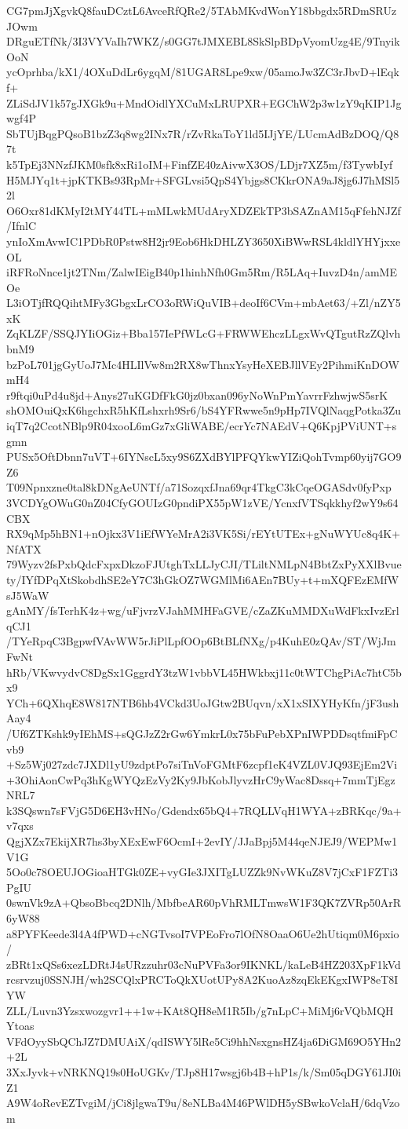 CG7pmJjXgvkQ8fauDCztL6AvceRfQRe2/5TAbMKvdWonY18bbgdx5RDmSRUzJOwm
DRguETfNk/3I3VYVaIh7WKZ/s0GG7tJMXEBL8SkSlpBDpVyomUzg4E/9TnyikOoN
ycOprhba/kX1/4OXuDdLr6ygqM/81UGAR8Lpe9xw/05amoJw3ZC3rJbvD+lEqkf+
ZLiSdJV1k57gJXGk9u+MndOidlYXCuMxLRUPXR+EGChW2p3w1zY9qKIP1Jgwgf4P
SbTUjBqgPQsoB1bzZ3q8wg2INx7R/rZvRkaToY1ld5IJjYE/LUcmAdBzDOQ/Q87t
k5TpEj3NNzfJKM0sfk8xRi1oIM+FinfZE40zAivwX3OS/LDjr7XZ5m/f3TywbIyf
H5MJYq1t+jpKTKBs93RpMr+SFGLvsi5QpS4Ybjgs8CKkrONA9aJ8jg6J7hMSl52l
O6Oxr81dKMyI2tMY44TL+mMLwkMUdAryXDZEkTP3bSAZnAM15qFfehNJZf/IfnlC
ynIoXmAvwIC1PDbR0Pstw8H2jr9Eob6HkDHLZY3650XiBWwRSL4kldlYHYjxxeOL
iRFRoNnce1jt2TNm/ZalwIEigB40p1hinhNfh0Gm5Rm/R5LAq+IuvzD4n/amMEOe
L3iOTjfRQQihtMFy3GbgxLrCO3oRWiQuVIB+deoIf6CVm+mbAet63/+Zl/nZY5xK
ZqKLZF/SSQJYIiOGiz+Bba157IePfWLcG+FRWWEhczLLgxWvQTgutRzZQlvhbnM9
bzPoL701jgGyUoJ7Mc4HLIlVw8m2RX8wThnxYsyHeXEBJllVEy2PihmiKnDOWmH4
r9ftqi0uPd4u8jd+Anys27uKGDfFkG0jz0bxan096yNoWnPmYavrrFzhwjwS5srK
shOMOuiQxK6hgchxR5hKfLshxrh9Sr6/bS4YFRwwe5n9pHp7IVQlNaqgPotka3Zu
iqT7q2CcotNBlp9R04xooL6mGz7xGliWABE/ecrYc7NAEdV+Q6KpjPViUNT+sgmn
PUSx5OftDbnn7uVT+6IYNscL5xy9S6ZXdBYlPFQYkwYIZiQohTvmp60yij7GO9Z6
T09Npnxzne0tal8kDNgAeUNTf/a71SozqxfJna69qr4TkgC3kCqeOGASdv0fyPxp
3VCDYgOWuG0nZ04CfyGOUIzG0pndiPX55pW1zVE/YcnxfVTSqkkhyf2wY9s64CBX
RX9qMp5hBN1+nOjkx3V1iEfWYeMrA2i3VK5Si/rEYtUTEx+gNuWYUc8q4K+NfATX
79Wyzv2fsPxbQdcFxpxDkzoFJUtghTxLLJyCJI/TLiltNMLpN4BbtZxPyXXlBvue
ty/IYfDPqXtSkobdhSE2eY7C3hGkOZ7WGMlMi6AEn7BUy+t+mXQFEzEMfWsJ5WaW
gAnMY/fsTerhK4z+wg/uFjvrzVJahMMHFaGVE/cZaZKuMMDXuWdFkxIvzErlqCJ1
/TYeRpqC3BgpwfVAvWW5rJiPlLpfOOp6BtBLfNXg/p4KuhE0zQAv/ST/WjJmFwNt
hRb/VKwvydvC8DgSx1GggrdY3tzW1vbbVL45HWkbxj11c0tWTChgPiAc7htC5bx9
YCh+6QXhqE8W817NTB6hb4VCkd3UoJGtw2BUqvn/xX1xSIXYHyKfn/jF3ushAay4
/Uf6ZTKshk9yIEhMS+sQGJzZ2rGw6YmkrL0x75bFuPebXPnIWPDDsqtfmiFpCvb9
+Sz5Wj027zdc7JXDl1yU9zdptPo7siTnVoFGMtF6zcpf1eK4VZL0VJQ93EjEm2Vi
+3OhiAonCwPq3hKgWYQzEzVy2Ky9JbKobJlyvzHrC9yWac8Dssq+7mmTjEgzNRL7
k3SQswn7sFVjG5D6EH3vHNo/Gdendx65bQ4+7RQLLVqH1WYA+zBRKqc/9a+v7qxs
QgjXZx7EkijXR7hs3byXExEwF6OcmI+2evIY/JJaBpj5M44qeNJEJ9/WEPMw1V1G
5Oo0c78OEUJOGioaHTGk0ZE+vyGIe3JXITgLUZZk9NvWKuZ8V7jCxF1FZTi3PgIU
0swnVk9zA+QbsoBbcq2DNlh/MbfbeAR60pVhRMLTmwsW1F3QK7ZVRp50ArR6yW88
a8PYFKeede3l4A4fPWD+cNGTvsoI7VPEoFro7lOfN8OaaO6Ue2hUtiqm0M6pxio/
zBRt1xQSs6xezLDRtJ4sURzzuhr03cNuPVFa3or9IKNKL/kaLeB4HZ203XpF1kVd
rcsrvzuj0SSNJH/wh2SCQlxPRCToQkXUotUPy8A2KuoAz8zqEkEKgxIWP8eT8IYW
ZLL/Luvn3Yzsxwozgvr1++1w+KAt8QH8eM1R5Ib/g7nLpC+MiMj6rVQbMQHYtoas
VFdOyySbQChJZ7DMUAiX/qdISWY5lRe5Ci9hhNsxgnsHZ4ja6DiGM69O5YHn2+2L
3XxJyvk+vNRKNQ19s0HoUGKv/TJp8H17wsgj6b4B+hP1s/k/Sm05qDGY61JI0iZ1
A9W4oRevEZTvgiM/jCi8jlgwaT9u/8eNLBa4M46PWlDH5ySBwkoVclaH/6dqVzom
